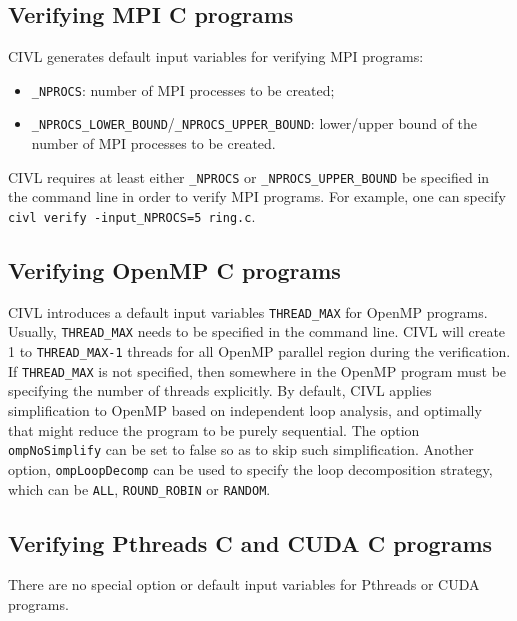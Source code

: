 \subsection{Verifying MPI C programs}
CIVL generates default input variables for verifying MPI programs:
\begin{itemize}
\item \texttt{\_NPROCS}: number of MPI processes to be created;
\item \texttt{\_NPROCS\_LOWER\_BOUND}/\texttt{\_NPROCS\_UPPER\_BOUND}: lower/upper bound of the number of MPI processes to be created.
\end{itemize}

CIVL requires at least either \texttt{\_NPROCS} or \texttt{\_NPROCS\_UPPER\_BOUND} be specified in the command line in order to verify MPI programs. For example, one can specify  \texttt{civl verify -input\_NPROCS=5 ring.c}. 

\subsection{Verifying OpenMP C programs}
CIVL introduces a default input variables \texttt{THREAD\_MAX} for OpenMP programs. Usually, \texttt{THREAD\_MAX} needs to be specified in the command line. CIVL will create 1 to \texttt{THREAD\_MAX-1} threads for all OpenMP parallel region during the verification. If \texttt{THREAD\_MAX} is not specified, then somewhere in the OpenMP program must be specifying the number of threads explicitly. By default, CIVL applies simplification to OpenMP based on independent loop analysis, and optimally that might reduce the program to be purely sequential. The option \texttt{ompNoSimplify} can be set to false so as to skip such simplification. Another option, \texttt{ompLoopDecomp} can be used to specify the loop decomposition strategy, which can be \texttt{ALL}, \texttt{ROUND\_ROBIN} or \texttt{RANDOM}.

\subsection{Verifying Pthreads C  and CUDA C programs}
There are no special option or default input variables for Pthreads or CUDA programs.




